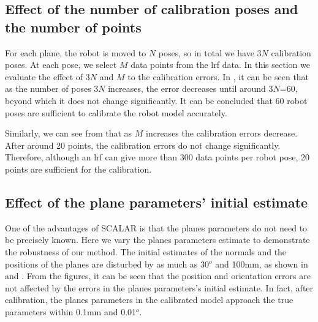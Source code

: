 \subsection{Effect of the number of calibration poses and the number of points}
\label{sec:calib_poses}
For each plane, the robot is moved to $N$ poses, so in total we have $3N$ calibration poses. At each pose, we select $M$ data points from the \ac{lrf} data. In this section we evaluate the effect of $3N$ and $M$ to the calibration errors. In , it can be seen that as the number of poses $3N$ increases, the error decreases until around $3N$=60, beyond which it does not change significantly. It can be concluded that 60 robot poses are sufficient to calibrate the robot model accurately. 


Similarly, we can see from  that as $M$ increases the calibration errors decrease. After around 20 points, the calibration errors do not change significantly. Therefore, although an \ac{lrf} can give more than 300 data points per robot pose, 20 points are sufficient for the calibration. 



\subsection{Effect of the plane parameters' initial estimate}
\label{sec:plane_params}
One of the advantages of SCALAR is that the planes parameters do not need to be precisely known. Here we vary the planes parameters estimate to demonstrate the robustness of our method. The initial estimates of the normals and the positions of the planes are disturbed by as much as 30$^o$ and 100mm, as shown in  and . From the figures, it can be seen that the position and orientation errors are not affected by the errors in the planes parameters's initial estimate. In fact, after calibration, the planes parameters in the calibrated model approach the true parameters within 0.1mm and 0.01$^o$.





